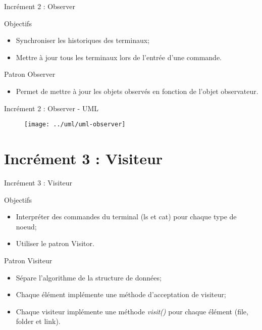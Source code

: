 \documentclass[utf8, 14pt]{beamer}
\begin{document}
	\begin{frame}{Incrément 2 : Observer}
		\begin{block}{Objectifs}
		\begin{itemize}
		\item Synchroniser les historiques des terminaux;
		\item Mettre à jour tous les terminaux lors de l'entrée d'une commande.
		\end{itemize}
		\end{block}
		
		\begin{exampleblock}{Patron Observer}
		\begin{itemize}
		\item Permet de mettre à jour les objets observés en fonction de l'objet observateur.
		\end{itemize}
		\end{exampleblock}					
	\end{frame}

	\begin{frame}{Incrément 2 : Observer - UML}
		\begin{figure}[!h]
		\centering
		\texttt{[image: ../uml/uml-observer]}
		\end{figure}		
	\end{frame}



\section{Incrément 3 : Visiteur}
	
	\begin{frame}{Incrément 3 : Visiteur}
		\begin{block}{Objectifs}
		\begin{itemize}
		\item Interpréter des commandes du terminal (ls et cat) pour chaque type de noeud;
		\item Utiliser le patron Visitor.
		\end{itemize}
		\end{block}
		
		\begin{exampleblock}{Patron Visiteur}
		\begin{itemize}
		\item Sépare l'algorithme de la structure de données;
		\item Chaque élément implémente une méthode d'acceptation de visiteur;
		\item Chaque visiteur implémente une méthode \emph{visit()} pour chaque élément (file, folder et link).
		\end{itemize}
		\end{exampleblock}					
	\end{frame}
\end{document}
